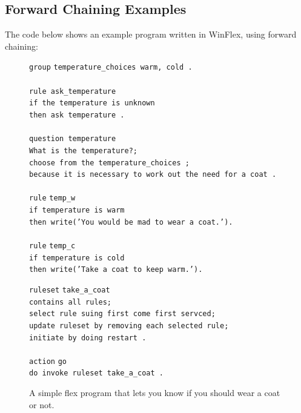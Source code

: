 \documentclass[12pt]{report}
\begin{document}
\subsection{Forward Chaining Examples}
The code below shows an example program written in WinFlex, using forward chaining:
\begin{figure}[H]
	\begin{tabbing}
		\texttt{group} \= \texttt{temperature\_choices warm, cold .}\\
		\\
		\texttt{rule ask\_temperature} \\
		\>	\texttt{if the temperature is unknown}\\
		\>	\texttt{then ask temperature .}\\
		\\
		\texttt{question temperature}\\
		\>	\texttt{What is the temperature?;}\\
		\>	\texttt{choose from the temperature\_choices ;}\\
		\> 	\texttt{because it is necessary to work out the need for a coat .}\\
		\\
		\texttt{rule} \= \texttt{temp\_w}\\
		\>	\texttt{if temperature is warm}\\
		\>	\texttt{then write('You would be mad to wear a coat.').}\\
		\\
		\texttt{rule} \= \texttt{temp\_c}\\
		\>	\texttt{if temperature is cold}\\
		\>	\texttt{then write('Take a coat to keep warm.').}\\
		\end{tabbing}
		\end{figure}
		\begin{figure}[H]
		\begin{tabbing}
		\ContinuedFloat
		\texttt{ruleset} \= \texttt{take\_a\_coat}\\
		\>	\texttt{contains all rules;}\\
		\>	\texttt{select rule suing first come first servced;}\\
		\>	\texttt{update ruleset by removing each selected rule;}\\
		\>	\texttt{initiate by doing restart .}\\
		\\
		\texttt{action} \= \texttt{go}\\
		\>	\texttt{do invoke ruleset take\_a\_coat .}\\
	\end{tabbing}
	\caption{A simple flex program that lets you know if you should wear a coat or not.}
	\label{fig:flex_code}
	\citep{flexsystems09}
\end{figure}
\end{document}
